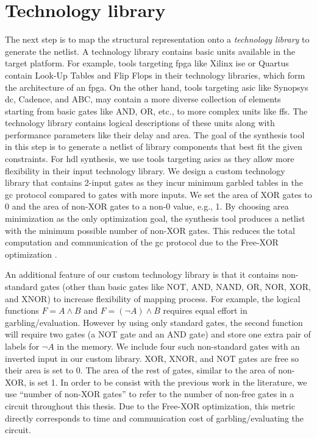 \section{Technology library}\label{sec:syn-techlib}
The next step is to map the structural representation onto a \emph{technology library} to generate the netlist.
A technology library contains basic units available in the target platform.
For example, tools targeting \acrfull{fpga} like Xilinx \acrshort{ise} or Quartus contain Look-Up Tables and Flip Flops in their technology libraries, which form the architecture of an \acrshort{fpga}.
On the other hand, tools targeting \acrfull{asic} like Synopsys \acrshort{dc}, Cadence, and ABC, may contain a more diverse collection of elements starting from basic gates like AND, OR, etc., to more complex units like \acrshort{ff}s.
The technology library contains logical descriptions of these units along with performance parameters like their delay and area.
The goal of the synthesis tool in this step is to generate a netlist of library components that best fit the given constraints.
For \acrshort{hdl} synthesis, we use tools targeting \acrshort{asic}s as they allow more flexibility in their input technology library.
We design a custom technology library that contains 2-input gates as they incur minimum garbled tables in the \acrshort{gc} protocol compared to gates with more inputs.
We set the area of XOR gates to 0 and the area of non-XOR gates to a non-0 value, e.g., 1.
By choosing area minimization as the only optimization goal, the synthesis tool produces a netlist with the minimum possible number of non-XOR gates.
This reduces the total computation and communication of the \acrshort{gc} protocol due to the Free-XOR optimization \cite{kolesnikov2008improved}.

An additional feature of our custom technology library is that it contains non-standard gates (other than basic gates like NOT, AND, NAND, OR, NOR, XOR, and XNOR) to increase flexibility of mapping process.
For example, the logical functions $F = A\wedge B$ and $F = (\neg A)\wedge B$ requires equal effort in garbling/evaluation.
However by using only standard gates, the second function will require two gates (a NOT gate and an AND gate) and store one extra pair of labels for $\neg A$ in the memory.
We include four such non-standard gates with an inverted input in our custom library.
XOR, XNOR, and NOT gates are free so their area is set to 0.
The area of the rest of gates, similar to the area of non-XOR, is set 1.
In order to be consist with the previous work in the literature, we use ``number of non-XOR gates'' to refer to the number of non-free gates in a circuit throughout this thesis.
Due to the Free-XOR optimization, this metric directly corresponds to time and communication cost of garbling/evaluating the circuit.

